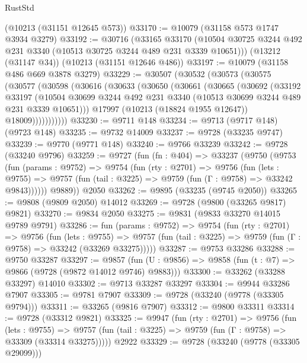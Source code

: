\begin{lexlean}{RustStd}
\begin{coremodule}
{\begin{coremodule}
{{{{{{{{{{{{{{{{{{{{{{{{{{    (@10213 (@31151 @12645 @573))
@33170 := @10079 (@31158 @573 @1747 @3934 @3279)
@33192 := @30716
    (@33165
      @33170
      (@10504 @30725 @3244 @492 @231 @3340 (@10513 @30725 @3244 @489 @231 @3339 @10651)))
    (@13212 (@31147 @34))
    (@10213 (@31151 @12646 @486))
@33197 := @10079 (@31158 @486 @669 @3878 @3279)
@33229 := @30507
    (@30532
      (@30573
        (@30575
          (@30577
            (@30598
              (@30616
                (@30633
                  (@30650
                    (@30661
                      (@30665
                        (@30692
                          (@33192
                            @33197
                            (@10504
                              @30699
                              @3244
                              @492
                              @231
                              @3340
                              (@10513 @30699 @3244 @489 @231 @3339 @10651)))
                          @17997
                          (@10213 (@18824 @1955 @12647))
                          @18009)))))))))))
@33230 := @9711 @148
@33234 := @9713 (@9717 @148) (@9723 @148)
@33235 := @9732 @14009
@33237 := @9728 (@33235 @9747)
@33239 := @9770 (@9771 @148)
@33240 := @9766 @33239
@33242 := @9728 (@33240 @9796)
@33259 := @9727
    (fun (fn : @404) =>
    @33237
      (@9750
        (@9753
          (fun (params : @9752) =>
          @9754
            (fun (rty : @2701) =>
            @9756
              (fun (lets : @9755) =>
              @9757 (fun (tail : @3225) => @9759 (fun (Γ : @9758) => @33242 @9843))))))
        @9889))
    @2050
@33262 := @9895 (@33235 (@9745 @2050))
@33265 := @9808 (@9809 @2050) @14012
@33269 := @9728 (@9800 (@33265 @9817) @9821)
@33270 := @9834 @2050
@33275 := @9831 (@9833 @33270 @14015 @9789 @9791)
@33286 := fun (params : @9752) =>
  @9754
    (fun (rty : @2701) =>
    @9756
      (fun (lets : @9755) =>
      @9757 (fun (tail : @3225) => @9759 (fun (Γ : @9758) => @33242 (@33269 @33275)))))
@33287 := @9753 @33286
@33288 := @9750 @33287
@33297 := @9857
    (fun (U : @9856) => @9858 (fun (t : @7) => @9866 (@9728 (@9872 @14012 @9746) @9883)))
@33300 := @33262 (@33288 @33297) @14010
@33302 := @9713 @33287 @33297
@33304 := @9944 @33286 @7907
@33305 := @9781 @7907
@33309 := @9728 (@33240 (@9778 (@33305 @9794)))
@33311 := @33265 (@9816 @7907)
@33312 := @9800 @33311
@33314 := @9728 (@33312 @9821)
@33325 := @9947
    (fun (rty : @2701) =>
    @9756
      (fun (lets : @9755) =>
      @9757 (fun (tail : @3225) => @9759 (fun (Γ : @9758) => @33309 (@33314 @33275)))))
    @2922
@33329 := @9728 (@33240 (@9778 (@33305 @29099)))
}}}}}}}}}}}}}}}}}}}}}}}}}}
\end{coremodule}}
\end{coremodule}
\end{lexlean}
